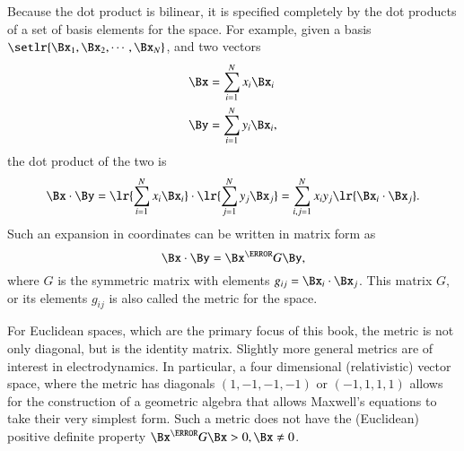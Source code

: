 %
%

Because the dot product is bilinear, it is
specified completely by the dot products of a set of basis elements for the space.
For example,
given a basis \( \setlr{ \Bx_1, \Bx_2, \cdots, \Bx_N} \), and two vectors
\begin{dmath}\label{eqn:prereq_standardbasis:240}
\begin{aligned}
   \Bx &= \sum_{i = 1}^N x_i \Bx_i \\
   \By &= \sum_{i = 1}^N y_i \Bx_i,
\end{aligned}
\end{dmath}
the dot product of the two is
\begin{dmath}\label{eqn:prereq_standardbasis:260}
\Bx \cdot \By
=
   \lr{ \sum_{i = 1}^N x_i \Bx_i } \cdot
   \lr{ \sum_{j = 1}^N y_j \Bx_j }
=
   \sum_{i,j = 1}^N x_i y_j \lr{ \Bx_i \cdot \Bx_j }.
\end{dmath}
Such an expansion in coordinates can be written in matrix form as
\begin{dmath}\label{eqn:prereq_standardbasis:280}
\Bx \cdot \By
=
\Bx^\T G \By,
\end{dmath}
where \( G \) is the symmetric matrix with elements \( g_{ij} = \Bx_i \cdot \Bx_j \).
This matrix \( G \), or its elements \( g_{ij} \) is also called the metric for the space.

For Euclidean spaces, which are the primary focus of this book, the metric is not only diagonal, but is the identity matrix.
Slightly more general metrics are of interest in electrodynamics.  In particular, a four dimensional (relativistic) vector space, where the metric has diagonals \( (1,-1,-1,-1) \) or \( (-1, 1,1,1) \) allows for the construction of a geometric algebra that allows Maxwell's equations to take their very simplest form.  Such a metric does not have the (Euclidean) positive definite property \( \Bx^\T G \Bx > 0, \Bx \ne 0 \).


